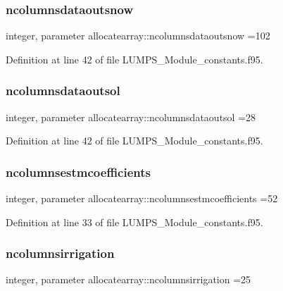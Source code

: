 \subsubsection{\texorpdfstring{ncolumnsdataoutsnow}{ncolumnsdataoutsnow}}
{\footnotesize\ttfamily integer, parameter allocatearray\+::ncolumnsdataoutsnow =102}



Definition at line 42 of file L\+U\+M\+P\+S\+\_\+\+Module\+\_\+constants.\+f95.

\mbox{\label{namespaceallocatearray_a3fbe7b1c5c42eb749b860207893f16cd}} 
\subsubsection{\texorpdfstring{ncolumnsdataoutsol}{ncolumnsdataoutsol}}
{\footnotesize\ttfamily integer, parameter allocatearray\+::ncolumnsdataoutsol =28}



Definition at line 42 of file L\+U\+M\+P\+S\+\_\+\+Module\+\_\+constants.\+f95.

\mbox{\label{namespaceallocatearray_ab6963e51ec24ecb58c1ee21fd8a70654}} 
\subsubsection{\texorpdfstring{ncolumnsestmcoefficients}{ncolumnsestmcoefficients}}
{\footnotesize\ttfamily integer, parameter allocatearray\+::ncolumnsestmcoefficients =52}



Definition at line 33 of file L\+U\+M\+P\+S\+\_\+\+Module\+\_\+constants.\+f95.

\mbox{\label{namespaceallocatearray_ae577fdefdd007ae24a4d46e52bbcd217}} 
\subsubsection{\texorpdfstring{ncolumnsirrigation}{ncolumnsirrigation}}
{\footnotesize\ttfamily integer, parameter allocatearray\+::ncolumnsirrigation =25}



